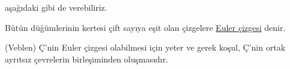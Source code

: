 \documentclass{amsbook}
\begin{document}
    aşağıdaki gibi de verebiliriz.
    \theoremstyle{definition}
    \begin{definition}
        Bütün düğümlerinin kertesi çift sayıya eşit olan çizgelere \underline{Euler çizgesi} denir.
    \end{definition}
    \theoremstyle{definition}
    \begin{definition}
        (Veblen) Ç'nin Euler çizgesi olabilmesi için yeter ve gerek koşul, Ç'nin ortak ayrıtsız çevrelerin birleşiminden oluşmasıdır.
    \end{definition}
\end{document}
